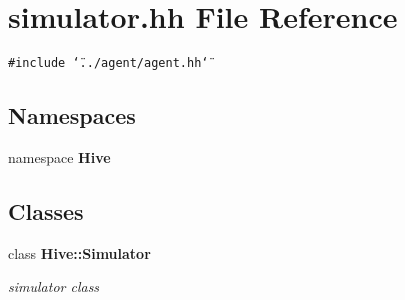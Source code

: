 \section{simulator.hh File Reference}
\label{simulator_8hh}


{\tt \#include \char`\"{}../agent/agent.hh\char`\"{}}\par
\subsection*{Namespaces}
\begin{CompactItemize}
\item 
namespace {\bf Hive}
\end{CompactItemize}
\subsection*{Classes}
\begin{CompactItemize}
\item 
class {\bf Hive::Simulator}
\begin{CompactList}\small\item\em simulator class \item\end{CompactList}\end{CompactItemize}
